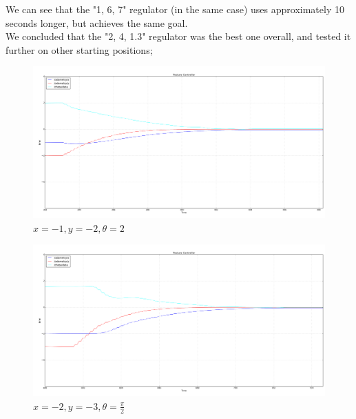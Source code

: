 \documentclass[a4paper,10pt]{article}
\begin{document}
		We can see that the "1, 6, 7" regulator (in the same case) uses approximately 10 seconds longer, but achieves the same goal.\\

		We concluded that the "2, 4, 1.3" regulator was the best one overall, and tested it further on other starting positions;



		\begin{figure}[H]
		\centering
		\includegraphics[width=1.1\textwidth]{rover2_rqt_plot91.png}
		\caption{ $x = -1,  y = -2,  \theta = 2$}	
 		\label{fig:plotbest}
		\end{figure}



		\begin{figure}[H]
		\centering
		\includegraphics[width=1.1\textwidth]{rover2_rqt_plot93_high_error.png}
		\caption{ $x = -2,  y = -3,  \theta=\frac{\pi}{2}$}	
 		\label{fig:plothigherror}
		\end{figure}
\end{document}

